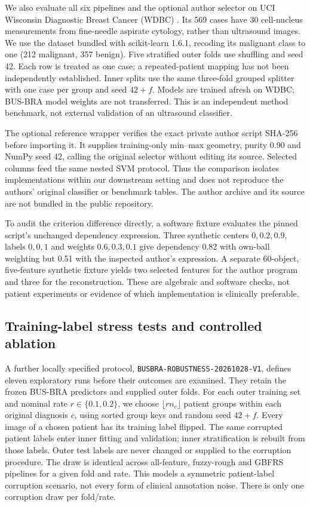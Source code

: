 \documentclass[11pt,a4paper]{article}
\begin{document}
We also evaluate all six pipelines and the optional author selector on UCI Wisconsin Diagnostic Breast Cancer (WDBC) \cite{wdbc}. Its 569 cases have 30 cell-nucleus measurements from fine-needle aspirate cytology, rather than ultrasound images. We use the dataset bundled with scikit-learn 1.6.1, recoding its malignant class to one (212 malignant, 357 benign). Five stratified outer folds use shuffling and seed 42. Each row is treated as one case; a repeated-patient mapping has not been independently established. Inner splits use the same three-fold grouped splitter with one case per group and seed $42+f$. Models are trained afresh on WDBC; BUS-BRA model weights are not transferred. This is an independent method benchmark, not external validation of an ultrasound classifier.

The optional reference wrapper verifies the exact private author script SHA-256 before importing it. It supplies training-only min--max geometry, purity 0.90 and NumPy seed 42, calling the original selector without editing its source. Selected columns feed the same nested SVM protocol. Thus the comparison isolates implementations within our downstream setting and does not reproduce the authors' original classifier or benchmark tables. The author archive and its source are not bundled in the public repository.

To audit the criterion difference directly, a software fixture evaluates the pinned script's unchanged dependency expression. Three synthetic centers $0,0.2,0.9$, labels $0,0,1$ and weights $0.6,0.3,0.1$ give dependency 0.82 with own-ball weighting but 0.51 with the inspected author's expression. A separate 60-object, five-feature synthetic fixture yields two selected features for the author program and three for the reconstruction. These are algebraic and software checks, not patient experiments or evidence of which implementation is clinically preferable.


\subsection{Training-label stress tests and controlled ablation}\label{sec:robustness}
A further locally specified protocol, \texttt{BUSBRA-ROBUSTNESS-}\allowbreak\texttt{20261028-V1}, defines eleven exploratory runs before their outcomes are examined. They retain the frozen BUS-BRA predictors and supplied outer folds. For each outer training set and nominal rate $r\in\{0.1,0.2\}$, we choose $\lfloor r n_c\rfloor$ patient groups within each original diagnosis $c$, using sorted group keys and random seed $42+f$. Every image of a chosen patient has its training label flipped. The same corrupted patient labels enter inner fitting and validation; inner stratification is rebuilt from those labels. Outer test labels are never changed or supplied to the corruption procedure. The draw is identical across all-feature, fuzzy-rough and GBFRS pipelines for a given fold and rate. This models a symmetric patient-label corruption scenario, not every form of clinical annotation noise. There is only one corruption draw per fold/rate.
\end{document}
